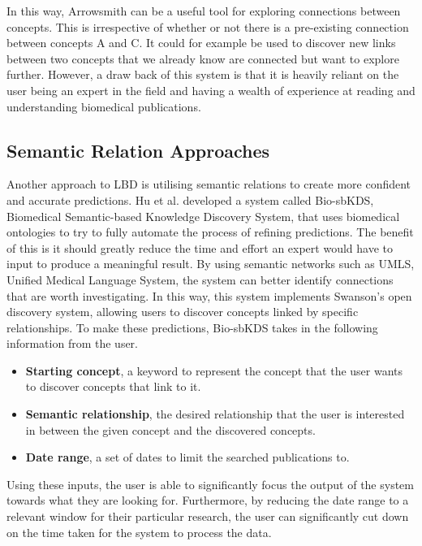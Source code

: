 \documentclass{l4proj}
\begin{document}
In this way, Arrowsmith can be a useful tool for exploring connections between concepts. This is irrespective of whether or not there is a pre-existing connection between concepts A and C. It could for example be used to discover new links between two concepts that we already know are connected but want to explore further. However, a draw back of this system is that it is heavily reliant on the user being an expert in the field and having a wealth of experience at reading and understanding biomedical publications. \\ 

\subsection{Semantic Relation Approaches}

Another approach to LBD is utilising semantic relations to create more confident and accurate predictions. Hu et al. developed a system called Bio-sbKDS, Biomedical Semantic-based Knowledge Discovery System, that uses biomedical ontologies to try to fully automate the process of refining predictions. The benefit of this is it should greatly reduce the time and effort an expert would have to input to produce a meaningful result. By using semantic networks such as UMLS, Unified Medical Language System, the system can better identify connections that are worth investigating. In this way, this system implements Swanson's open discovery system, allowing users to discover concepts linked by specific relationships. To make these predictions, Bio-sbKDS takes in the following information from the user. 
\\ 
\begin{itemize}
    \item \textbf{Starting concept}, a keyword to represent the concept that the user wants to discover concepts that link to it. \\
    \item \textbf{Semantic relationship}, the desired relationship that the user is interested in between the given concept and the discovered concepts. \\
    \item \textbf{Date range}, a set of dates to limit the searched publications to. \\
\end{itemize}

Using these inputs, the user is able to significantly focus the output of the system towards what they are looking for. Furthermore, by reducing the date range to a relevant window for their particular research, the user can significantly cut down on the time taken for the system to process the data. \\
\end{document}
